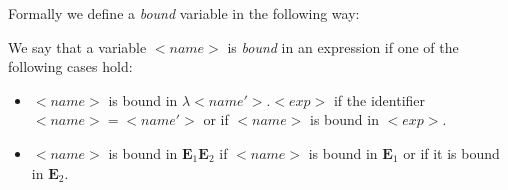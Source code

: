 Formally we define a \emph{bound} variable in the following
way:

\begin{defn}
	We say that a variable $<name>$ is \emph{bound} in an
	expression if one of the following cases hold:
	\begin{itemize}
		\item $<name>$ is bound in $\lambda <name'>.<exp>$
			if the identifier $<name>=<name'>$ or if
			$<name>$ is bound in $<exp>$.
		\item $<name>$ is bound in $\textbf{E}_1 \textbf{E}_2$
			if $<name>$ is bound in $\textbf{E}_1$ or if it is
			bound in $\textbf{E}_2$.
	\end{itemize}
\end{defn}
